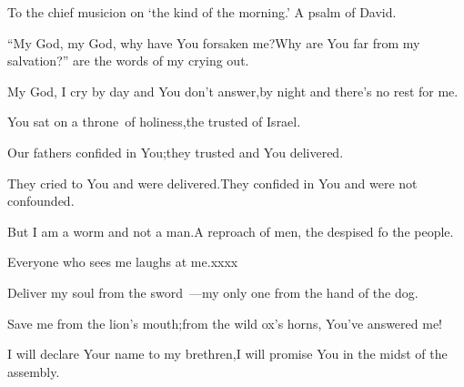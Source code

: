 
\begin{inparaenum}
  \noindent{} To the chief musicion on `the kind of the morning.' A psalm of David.\smallskip%

  \pc{} ``My God, my God, why have You forsaken me?\pa{}Why are You far from my salvation?'' are the words of my crying out.%

  \pc{} My God, I cry by day and You don't answer,\pa{}by night and there's no rest for me.%

  \pd{} You sat on a throne\understood{}\ of holiness,\pa{}the trusted of Israel.%

  \pc{} Our fathers confided in You;\pa{}they trusted and You delivered.%

  \pc{} They cried to You and were delivered.\pa{}They confided in You and were not confounded.%

  \pd{} But I am a worm and not a man.\pa{}A reproach of men, the despised fo the people.%

  \pc{} Everyone who sees me laughs at me.\pa{}xxxx%

  \pc{} %

  \pc{} %

  \pc{} %

  \pc{} %

  \pd{} %

  \pc{} %

  \pc{} %

  \pd{}%

  \pc{} %

  \pd{}%

  \pc{} %

  \pd{}%

  \pc{} %

  \pc{} %

  \pd{} %

  \pc{} Deliver my soul from the sword~---\pa{}my only one from the hand of the dog.%

  \pc{} Save me from the lion's mouth;\pa{}from the wild ox's horns, You've answered me!%

  \pd{} I will declare Your name to my brethren,\pa{}I will promise You in the midst of the assembly.%


\end{inparaenum}
